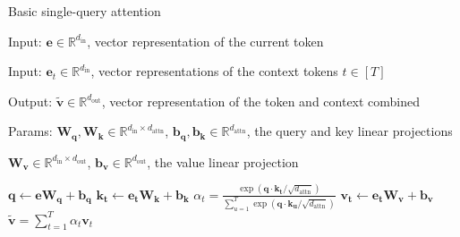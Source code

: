 \documentclass[12pt,aspectratio=169,handout]{beamer}
\begin{document}
\begin{frame}{Basic single-query attention}
	
	\begin{minipage}[t][10cm][t]{15cm}
		
		Input: $\bm{e} \in \mathbb{R}^{d_\text{in}}$, vector representation of the current token
		
		Input: $\bm{e}_t \in \mathbb{R}^{d_\text{in}}$, vector representations of the context tokens $t \in [T]$
		
		Output: $\bm{\tilde v} \in \mathbb{R}^{d_\text{out}}$, vector representation of the token and context combined
		
		Params: $\bm{W_q}, \bm{W_k} \in \mathbb{R}^{d_\text{in} \times d_\text{attn}}$, $\bm{b_q}, \bm{b_k} \in \mathbb{R}^{d_\text{attn}}$, the query and key linear projections
		
		$\bm{W_v} \in \mathbb{R}^{d_\text{in} \times d_\text{out}}$, $ \bm{b_v} \in \mathbb{R}^{d_\text{out}}$, the value linear projection
		
		\begin{algorithmic}[1]
			\State $\bm{q} \gets \bm{e} \bm{W_q} + \bm{b_q}$
			\State $\bm{k_t} \gets \bm{e_t} \bm{W_k} + \bm{b_k}$
			\State $\alpha_{t} = \frac{
				\exp(\bm{q} \cdot \bm{k_t} / \sqrt{d_{\text{attn}}})
			}{
				\sum_{u = 1}^{T}\exp(\bm{q} \cdot \bm{k_u} / \sqrt{d_{\text{attn}}})
			}$
			\State $\bm{v_t} \gets \bm{e_t} \bm{W_v} + \bm{b_v}$
			\EndFor
			\State \Return $\bm{\tilde v} = \sum_{t=1}^T \alpha_t \bm{v}_t$
			\EndFunction
		\end{algorithmic}
		
	\end{minipage}
\end{frame}
\end{document}
